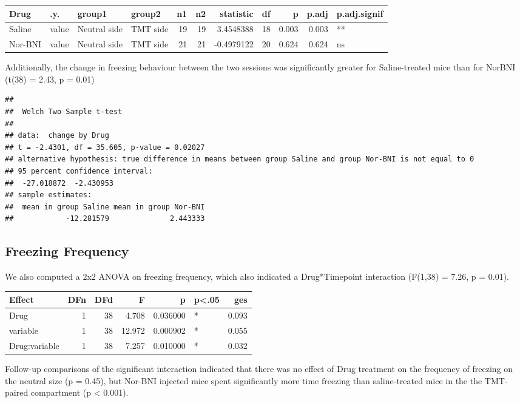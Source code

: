 \documentclass[
]{book}
\begin{document}
\begin{tabular}{l|l|l|l|r|r|r|r|r|r|l}
\hline
Drug & .y. & group1 & group2 & n1 & n2 & statistic & df & p & p.adj & p.adj.signif\\
\hline
Saline & value & Neutral side & TMT side & 19 & 19 & 3.4548388 & 18 & 0.003 & 0.003 & **\\
\hline
Nor-BNI & value & Neutral side & TMT side & 21 & 21 & -0.4979122 & 20 & 0.624 & 0.624 & ns\\
\hline
\end{tabular}

Additionally, the change in freezing behaviour between the two sessions was significantly greater for Saline-treated mice than for NorBNI (t(38) = 2.43, p = 0.01)

\begin{verbatim}
## 
##  Welch Two Sample t-test
## 
## data:  change by Drug
## t = -2.4301, df = 35.605, p-value = 0.02027
## alternative hypothesis: true difference in means between group Saline and group Nor-BNI is not equal to 0
## 95 percent confidence interval:
##  -27.018872  -2.430953
## sample estimates:
##  mean in group Saline mean in group Nor-BNI 
##            -12.281579              2.443333
\end{verbatim}

\hypertarget{freezing-frequency}{%
\subsection{Freezing Frequency}\label{freezing-frequency}}

We also computed a 2x2 ANOVA on freezing frequency, which also indicated a Drug*Timepoint interaction (F(1,38) = 7.26, p = 0.01).

\begin{tabular}{l|r|r|r|r|l|r}
\hline
Effect & DFn & DFd & F & p & p<.05 & ges\\
\hline
Drug & 1 & 38 & 4.708 & 0.036000 & * & 0.093\\
\hline
variable & 1 & 38 & 12.972 & 0.000902 & * & 0.055\\
\hline
Drug:variable & 1 & 38 & 7.257 & 0.010000 & * & 0.032\\
\hline
\end{tabular}

Follow-up comparisons of the significant interaction indicated that there was no effect of Drug treatment on the frequency of freezing on the neutral size (p = 0.45), but Nor-BNI injected mice spent significantly more time freezing than saline-treated mice in the the TMT-paired compartment (p \textless{} 0.001).
\end{document}

